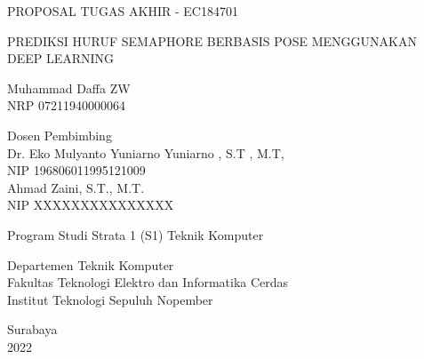 \begin{large}
  PROPOSAL TUGAS AKHIR - EC184701
\end{large}

\vspace{\fill}

\begin{spacing}{1.5}
  \begin{Large}
    PREDIKSI HURUF SEMAPHORE BERBASIS POSE MENGGUNAKAN DEEP LEARNING%
  \end{Large}
\end{spacing}

\vspace{\fill}

\begin{large}
  Muhammad Daffa ZW \\
  \textnormal{NRP 07211940000064}
\end{large}

\vspace{\fill}

\begin{large}
  \textnormal{Dosen Pembimbing} \\
  Dr. Eko Mulyanto Yuniarno Yuniarno , S.T , M.T, \\
  \textnormal{NIP 196806011995121009} \\
  Ahmad Zaini, S.T., M.T. \\
  \textnormal{NIP XXXXXXXXXXXXXXX}
\end{large}

\vspace{\fill}

Program Studi Strata 1 (S1) Teknik Komputer \\

\normalfont

Departemen Teknik Komputer \\
Fakultas Teknologi Elektro dan Informatika Cerdas \\
Institut Teknologi Sepuluh Nopember

Surabaya \\
2022
